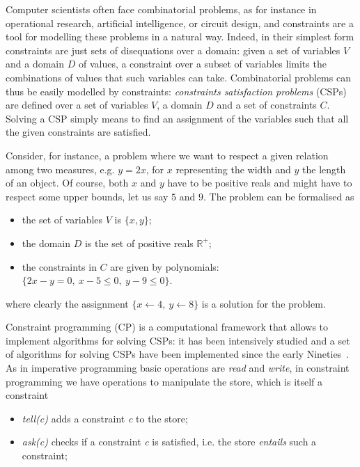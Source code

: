 \documentclass{llncs}
\begin{document}
Computer scientists often face combinatorial problems, as for instance in operational research, artificial intelligence, or circuit design,
and constraints are a tool for modelling these problems in a natural way. 
Indeed, in their simplest form constraints are just sets of disequations over a domain: given a set of variables $V$ and a domain $D$ of values, 
a constraint over a subset of variables limits the combinations of values that such variables can take. 
Combinatorial problems can thus be easily modelled by constraints: \emph{constraints satisfaction problems} (CSPs)
are defined over a set of variables $V$, a domain $D$ and a set of constraints $C$. Solving a CSP simply means 
to find an assignment of the variables such that all the given constraints are satisfied. 

Consider, for instance, a problem where we want to respect a given relation among two measures, e.g. $y = 2x$, for $x$ representing the width and $y$ the length of an object. 
Of course, both $x$ and $y$ have to be positive reals and might have to respect some upper bounds, let us say $5$ and $9$. The problem can be formalised as
%
\begin{itemize}
	\item the set of variables $V$ is $\{x,y\}$;
	\item the domain $D$ is the set of positive reals $\mathbb{R}^+$;
	\item the constraints in $C$ are given by polynomials: $\{2x-y = 0, \ x-5 \leq 0, \ y-9 \leq 0\}$.
\end{itemize}
where clearly the assignment $\{x \leftarrow 4, \ y \leftarrow 8\}$ is a solution for the problem.

\newpage
Constraint programming (CP) is a computational framework that allows to implement algorithms for solving CSPs:  
it has been intensively studied and a set of algorithms for solving CSPs have been implemented since the early Nineties~\cite{aijour}. 
%
As in imperative programming basic operations are \emph{read} and \emph{write}, in constraint programming we have operations to manipulate the store, which is itself a constraint

\begin{itemize}
	\item \emph{tell(c)} adds a constraint \emph{c} to the store;
	\item \emph{ask(c)} checks if a constraint \emph{c} is satisfied, i.e. the store \emph{entails} such a constraint;
\end{itemize}
\end{document}
